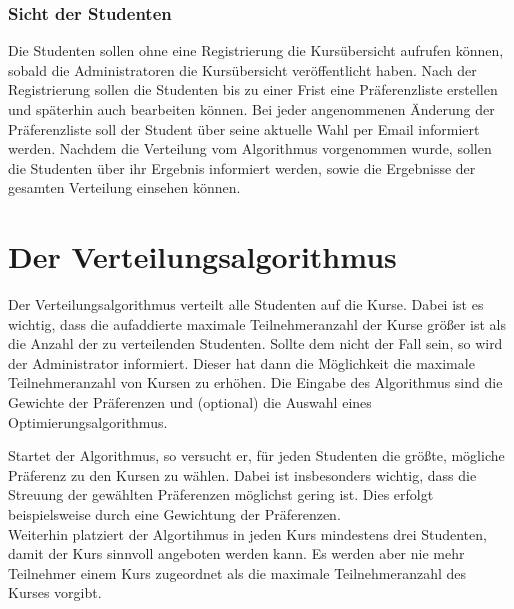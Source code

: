                 
            \subsubsection{Sicht der Studenten}
                Die Studenten sollen ohne eine Registrierung die Kursübersicht aufrufen können, sobald die Administratoren die Kursübersicht veröffentlicht haben.
                Nach der Registrierung sollen die Studenten bis zu einer Frist eine Präferenzliste erstellen und späterhin auch bearbeiten können.
                Bei jeder angenommenen Änderung der Präferenzliste soll der Student über seine aktuelle Wahl per Email informiert werden.
                Nachdem die Verteilung vom Algorithmus vorgenommen wurde, sollen die Studenten über ihr Ergebnis informiert werden, sowie die Ergebnisse der gesamten Verteilung einsehen können.
    
    
    
    
            
    
    \section{Der Verteilungsalgorithmus}
    Der Verteilungsalgorithmus verteilt alle Studenten auf die Kurse.
    Dabei ist es wichtig, dass die aufaddierte maximale Teilnehmeranzahl der Kurse größer ist als die Anzahl der zu verteilenden Studenten.
    Sollte dem nicht der Fall sein, so wird der Administrator informiert.
    Dieser hat dann die Möglichkeit die maximale Teilnehmeranzahl von Kursen zu erhöhen.
    Die Eingabe des Algorithmus sind die Gewichte der Präferenzen und (optional) die Auswahl eines Optimierungsalgorithmus.
    
    Startet der Algorithmus, so versucht er, für jeden Studenten die größte, mögliche Präferenz zu den Kursen zu wählen.
    Dabei ist insbesonders wichtig, dass die Streuung der gewählten Präferenzen möglichst gering ist.
    Dies erfolgt beispielsweise durch eine Gewichtung der Präferenzen.\\
    Weiterhin platziert der Algortihmus in jeden Kurs mindestens drei Studenten, damit der Kurs sinnvoll angeboten werden kann.
    Es werden aber nie mehr Teilnehmer einem Kurs zugeordnet als die maximale Teilnehmeranzahl des Kurses vorgibt.
    
